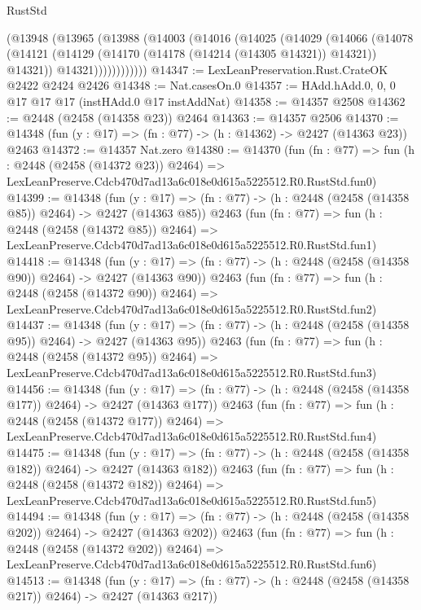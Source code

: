 \begin{lexlean}{RustStd}
\begin{coremodule}
          (@13948
            (@13965
              (@13988
                (@14003
                  (@14016
                    (@14025
                      (@14029
                        (@14066
                          (@14078
                            (@14121
                              (@14129 (@14170 (@14178 (@14214 (@14305 @14321)) @14321)) @14321))
                            @14321))))))))))))
@14347 := LexLeanPreservation.Rust.CrateOK @2422 @2424 @2426
@14348 := Nat.casesOn.{0}
@14357 := HAdd.hAdd.{0, 0, 0} @17 @17 @17 (instHAdd.{0} @17 instAddNat)
@14358 := @14357 @2508
@14362 := @2448 (@2458 (@14358 @23)) @2464
@14363 := @14357 @2506
@14370 := @14348 (fun (y : @17) => (fn : @77) -> (h : @14362) -> @2427 (@14363 @23)) @2463
@14372 := @14357 Nat.zero
@14380 := @14370
    (fun (fn : @77) =>
    fun (h : @2448 (@2458 (@14372 @23)) @2464) =>
    LexLeanPreserve.Cdcb470d7ad13a6c018e0d615a5225512.R0.RustStd.fun0)
@14399 := @14348
    (fun (y : @17) => (fn : @77) -> (h : @2448 (@2458 (@14358 @85)) @2464) -> @2427 (@14363 @85))
    @2463
    (fun (fn : @77) =>
    fun (h : @2448 (@2458 (@14372 @85)) @2464) =>
    LexLeanPreserve.Cdcb470d7ad13a6c018e0d615a5225512.R0.RustStd.fun1)
@14418 := @14348
    (fun (y : @17) => (fn : @77) -> (h : @2448 (@2458 (@14358 @90)) @2464) -> @2427 (@14363 @90))
    @2463
    (fun (fn : @77) =>
    fun (h : @2448 (@2458 (@14372 @90)) @2464) =>
    LexLeanPreserve.Cdcb470d7ad13a6c018e0d615a5225512.R0.RustStd.fun2)
@14437 := @14348
    (fun (y : @17) => (fn : @77) -> (h : @2448 (@2458 (@14358 @95)) @2464) -> @2427 (@14363 @95))
    @2463
    (fun (fn : @77) =>
    fun (h : @2448 (@2458 (@14372 @95)) @2464) =>
    LexLeanPreserve.Cdcb470d7ad13a6c018e0d615a5225512.R0.RustStd.fun3)
@14456 := @14348
    (fun (y : @17) => (fn : @77) -> (h : @2448 (@2458 (@14358 @177)) @2464) -> @2427 (@14363 @177))
    @2463
    (fun (fn : @77) =>
    fun (h : @2448 (@2458 (@14372 @177)) @2464) =>
    LexLeanPreserve.Cdcb470d7ad13a6c018e0d615a5225512.R0.RustStd.fun4)
@14475 := @14348
    (fun (y : @17) => (fn : @77) -> (h : @2448 (@2458 (@14358 @182)) @2464) -> @2427 (@14363 @182))
    @2463
    (fun (fn : @77) =>
    fun (h : @2448 (@2458 (@14372 @182)) @2464) =>
    LexLeanPreserve.Cdcb470d7ad13a6c018e0d615a5225512.R0.RustStd.fun5)
@14494 := @14348
    (fun (y : @17) => (fn : @77) -> (h : @2448 (@2458 (@14358 @202)) @2464) -> @2427 (@14363 @202))
    @2463
    (fun (fn : @77) =>
    fun (h : @2448 (@2458 (@14372 @202)) @2464) =>
    LexLeanPreserve.Cdcb470d7ad13a6c018e0d615a5225512.R0.RustStd.fun6)
@14513 := @14348
    (fun (y : @17) => (fn : @77) -> (h : @2448 (@2458 (@14358 @217)) @2464) -> @2427 (@14363 @217))

\end{coremodule}
\end{lexlean}
